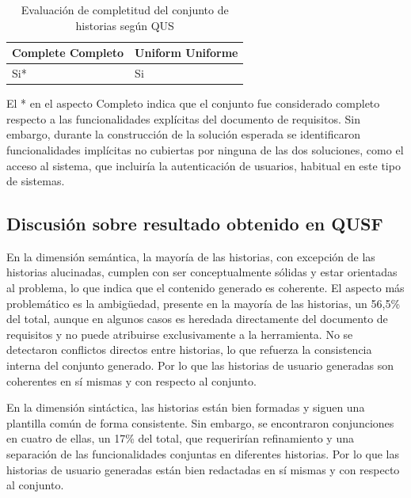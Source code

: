 \begin{table}[h!]
\centering
\small
\begin{tabular}{|p{1.5cm}|p{1.5cm}|}
\hline
\textbf{Complete} \newline Completo & \textbf{Uniform} \newline Uniforme  \\ \hline
Si* & Si \\\hline
\end{tabular}
\caption{Evaluación de completitud del conjunto de historias según QUS}
\label{table:prag2}
\end{table}

El * en el aspecto Completo indica que el conjunto fue considerado completo respecto a las funcionalidades explícitas del documento de requisitos. Sin embargo, durante la construcción de la solución esperada se identificaron funcionalidades implícitas no cubiertas por ninguna de las dos soluciones, como el acceso al sistema, que incluiría la autenticación de usuarios, habitual en este tipo de sistemas.

\subsection{Discusión sobre resultado obtenido en QUSF}
En la dimensión semántica, la mayoría de las historias, con excepción de las historias alucinadas, cumplen con ser conceptualmente sólidas y estar orientadas al problema, lo que indica que el contenido generado es coherente. El aspecto más problemático es la ambigüedad, presente en la mayoría de las historias, un 56,5\% del total, aunque en algunos casos es heredada directamente del documento de requisitos y no puede atribuirse exclusivamente a la herramienta. No se detectaron conflictos directos entre historias, lo que refuerza la consistencia interna del conjunto generado. Por lo que las historias de usuario generadas son coherentes en sí mismas y con respecto al conjunto.

En la dimensión sintáctica, las historias están bien formadas y siguen una plantilla común de forma consistente. Sin embargo, se encontraron conjunciones en cuatro de ellas, un 17\% del total, que requerirían refinamiento y una separación de las funcionalidades conjuntas en diferentes historias. Por lo que las historias de usuario generadas están bien redactadas en sí mismas y con respecto al conjunto.

